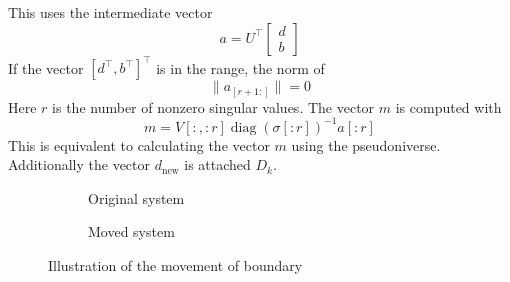 \documentclass[doctype=mastersthesis,BCOR=15mm,biblatex]{ldvbook}%
\DeclareMathOperator{\diag}{diag}
\begin{document}
This uses the intermediate vector 
\begin{equation}
	a = U^\top 	
	\begin{bmatrix}
	d\\b
	\end{bmatrix}
\end{equation} 
If the vector $[d^\top,b^\top]^\top$ is in the range, the norm of 
\begin{equation}
	\|a_{[r+1:]} \| = 0
\end{equation}
Here $r$ is the number of nonzero singular values.
The vector $m$ is computed with 
\begin{equation}
	m = V[:,:r] \diag(\sigma[:r])^{-1} a[:r]
\end{equation}
This is equivalent to calculating the vector $m$ using the pseudoniverse.  
Additionally the vector $d_\text{new}$ is attached $D_k$.
\begin{figure}[htb]
	\centering
	
	\begin{subfigure}[b]{0.45\textwidth}
		\caption{Original system}
		\label{fig:move_right_a}
	\end{subfigure}
	\hspace{0.8cm}
	\begin{subfigure}[b]{0.45\textwidth}
		\caption{Moved system}
		\label{fig:move_right_b}
	\end{subfigure}
	\caption{Illustration of the movement of boundary}
	\label{fig:move_right}
\end{figure}
\end{document}
